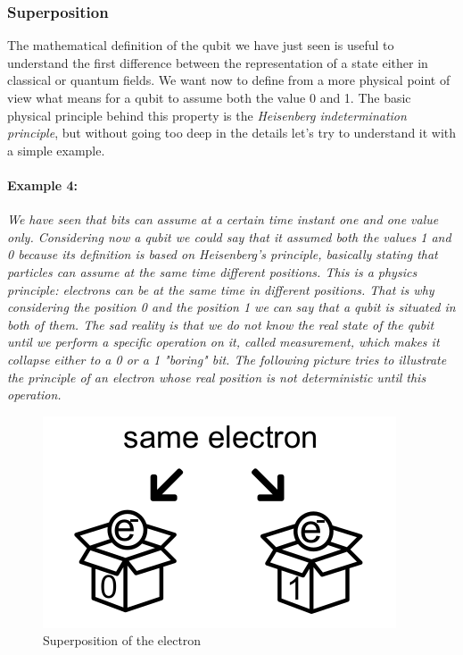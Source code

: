 \documentclass[english]{article}
\begin{document}
			\subsubsection{Superposition}
			\label{sec:superposition}
				The mathematical definition of the qubit we have just seen is useful to understand the first difference between the representation of a state either in classical or quantum fields. We want now to define from a more physical point of view what means for a qubit to assume both the value 0 and 1. The basic physical principle behind this property is the \emph{Heisenberg indetermination principle}, but without going too deep in the details let's try to understand it with a simple example. 
				
				\paragraph{Example 4:} \emph{We have seen that bits can assume at a certain time instant one and one value only. Considering now a qubit we could say that it assumed both the values 1 and 0 because its definition is based on Heisenberg's principle, basically stating that particles can assume at the same time different positions. This is a physics principle: electrons can be at the same time in different positions. That is why considering the position 0 and the position 1 we can say that a qubit is situated in both of them. The sad reality is that we do not know the real state of the qubit until we perform a specific operation on it, called measurement, which makes it collapse either to a 0 or a 1 "boring" bit. The following picture tries to illustrate the principle of an electron whose real position is not deterministic until this operation.}
				
				\newpage
				
				\begin{figure}[ht]
					\centering
					\includegraphics[scale=0.75]{superposition.png}
					\caption{Superposition of the electron}
				\end{figure}
			
\end{document}
